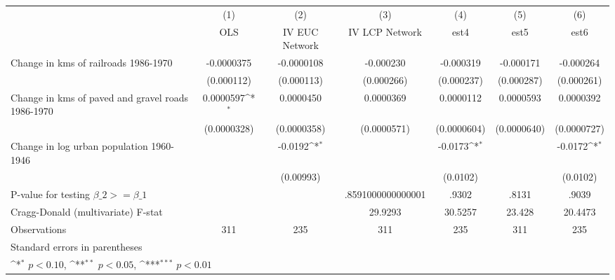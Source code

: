 {
\def\sym#1{\ifmmode^{#1}\else\(^{#1}\)\fi}
\begin{tabular}{l*{6}{c}}
\hline\hline
                &\multicolumn{1}{c}{(1)}&\multicolumn{1}{c}{(2)}&\multicolumn{1}{c}{(3)}&\multicolumn{1}{c}{(4)}&\multicolumn{1}{c}{(5)}&\multicolumn{1}{c}{(6)}\\
                &\multicolumn{1}{c}{OLS}&\multicolumn{1}{c}{IV EUC Network}&\multicolumn{1}{c}{IV LCP Network}&\multicolumn{1}{c}{est4}&\multicolumn{1}{c}{est5}&\multicolumn{1}{c}{est6}\\
\hline
Change in kms of railroads 1986-1970&-0.0000375         &-0.0000108         &-0.000230         &-0.000319         &-0.000171         &-0.000264         \\
                &(0.000112)         &(0.000113)         &(0.000266)         &(0.000237)         &(0.000287)         &(0.000261)         \\
[1em]
Change in kms of paved and gravel roads 1986-1970&0.0000597\sym{*}  &0.0000450         &0.0000369         &0.0000112         &0.0000593         &0.0000392         \\
                &(0.0000328)         &(0.0000358)         &(0.0000571)         &(0.0000604)         &(0.0000640)         &(0.0000727)         \\
[1em]
Change in log urban population 1960-1946&                  &  -0.0192\sym{*}  &                  &  -0.0173\sym{*}  &                  &  -0.0172\sym{*}  \\
                &                  &(0.00993)         &                  & (0.0102)         &                  & (0.0102)         \\
\hline
P-value for testing $\beta\_{2} >= \beta\_{1}$&                  &                  &.8591000000000001         &    .9302         &    .8131         &    .9039         \\
Cragg-Donald (multivariate) F-stat&                  &                  &  29.9293         &  30.5257         &   23.428         &  20.4473         \\
Observations    &      311         &      235         &      311         &      235         &      311         &      235         \\
\hline\hline
\multicolumn{7}{l}{\footnotesize Standard errors in parentheses}\\
\multicolumn{7}{l}{\footnotesize \sym{*} \(p<0.10\), \sym{**} \(p<0.05\), \sym{***} \(p<0.01\)}\\
\end{tabular}
}

